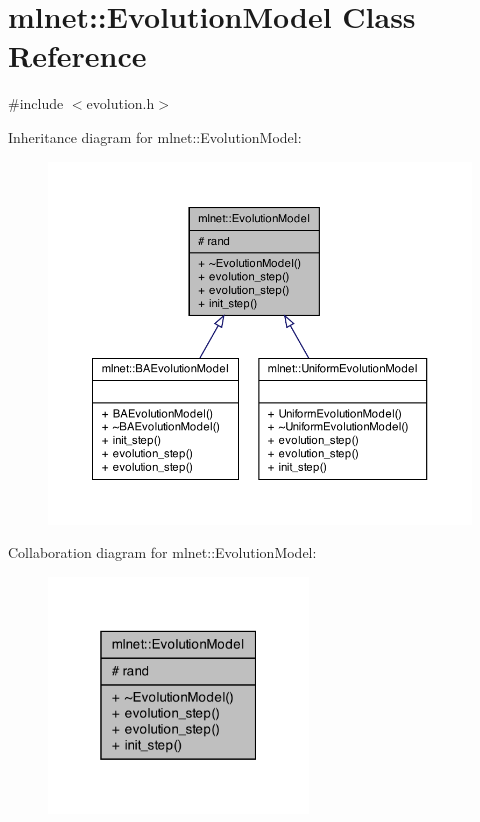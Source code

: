 \hypertarget{classmlnet_1_1_evolution_model}{\section{mlnet\+:\+:Evolution\+Model Class Reference}
\label{classmlnet_1_1_evolution_model}
}


{\ttfamily \#include $<$evolution.\+h$>$}



Inheritance diagram for mlnet\+:\+:Evolution\+Model\+:\nopagebreak
\begin{figure}[H]
\begin{center}
\leavevmode
\includegraphics[width=350pt]{classmlnet_1_1_evolution_model__inherit__graph}
\end{center}
\end{figure}


Collaboration diagram for mlnet\+:\+:Evolution\+Model\+:\nopagebreak
\begin{figure}[H]
\begin{center}
\leavevmode
\includegraphics[width=196pt]{classmlnet_1_1_evolution_model__coll__graph}
\end{center}
\end{figure}
